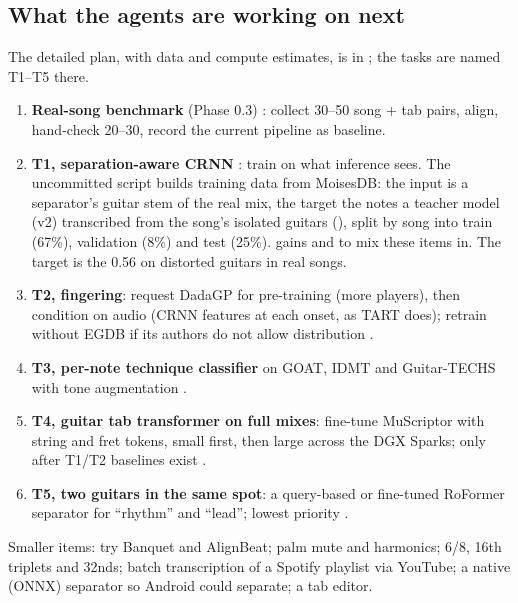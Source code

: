 \subsection{What the agents are working on next}
\label{sec:next}

The detailed plan, with data and compute estimates, is in
; the tasks are named T1--T5 there.

\begin{nextsteps}[: in order]
\begin{enumerate}
\item \textbf{Real-song benchmark} (Phase 0.3) \planned: collect 30--50 song +
  tab pairs, align, hand-check 20--30, record the current pipeline as baseline.
\item \textbf{T1, separation-aware CRNN} \wip: train on what inference sees.
  The uncommitted script  builds
  training data from MoisesDB: the input is a separator's guitar stem of the
  real mix, the target the notes a teacher model (v2) transcribed from the
  song's isolated guitars (), split by song into train
  (67\%), validation (8\%) and test (25\%).  gains
   and  to mix these items in. The target
  is the 0.56 on distorted guitars in real songs.
\item \textbf{T2, fingering}: request DadaGP for pre-training (more players),
  then condition on audio (CRNN features at each onset, as TART does); retrain
  without EGDB if its authors do not allow distribution \planned.
\item \textbf{T3, per-note technique classifier} on GOAT, IDMT and Guitar-TECHS
  with tone augmentation \planned.
\item \textbf{T4, guitar tab transformer on full mixes}: fine-tune MuScriptor
  with string and fret tokens, small first, then large across the DGX Sparks;
  only after T1/T2 baselines exist \planned.
\item \textbf{T5, two guitars in the same spot}: a query-based or fine-tuned
  RoFormer separator for ``rhythm'' and ``lead''; lowest priority \planned.
\end{enumerate}
Smaller items: try Banquet and AlignBeat; palm mute and harmonics; 6/8,
16th triplets and 32nds; batch transcription of a Spotify playlist via YouTube;
a native (ONNX) separator so Android could separate; a tab editor.
\end{nextsteps}

